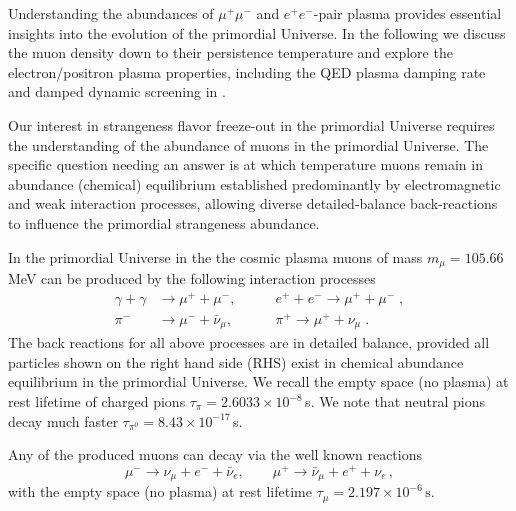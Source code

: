 Understanding the abundances of $\mu^+\mu^-$ and $e^+e^-$-pair plasma provides essential insights into the evolution of the primordial Universe. In the following we discuss the muon density down to their persistence temperature and explore the electron/positron plasma properties, including the QED plasma damping rate and damped dynamic screening in .

Our interest in strangeness flavor freeze-out in the primordial Universe requires the understanding of the abundance of muons in the primordial Universe. The specific question needing an answer is at which temperature muons remain in abundance (chemical) equilibrium established predominantly by electromagnetic and weak interaction processes, allowing diverse detailed-balance back-reactions to influence the primordial strangeness abundance.

In the primordial Universe in the the cosmic plasma muons of mass $m_\mu=105.66$\,MeV can be produced by the following interaction processes~\cite{Yang:2024ret,Rafelski:2021aey}
\begin{align} 
\gamma+\gamma&\longrightarrow\mu^++\mu^-,\qquad &e^++e^-\longrightarrow \mu^++\mu^-\;,\\
\pi^-&\longrightarrow\mu^-+\bar{\nu}_\mu,\qquad &\pi^+ \longrightarrow\mu^++\nu_\mu\;.
\end{align}
The back reactions for all above processes are in detailed balance, provided all particles shown on the right hand side (RHS) exist in chemical abundance equilibrium in the primordial Universe. We recall the empty space (no plasma) at rest lifetime of charged pions $\tau_\pi=2.6033\times 10^{-8}$\,s. We note that neutral pions decay much faster $\tau_{\pi^0}=8.43\times 10^{-17}$\,s.

Any of the produced muons can decay via the well known reactions
\begin{equation}
\mu^-\rightarrow\nu_\mu+e^-+\bar{\nu}_e,\qquad \mu^+\rightarrow\bar{\nu}_\mu+e^++\nu_e\,,
\end{equation} 
with the empty space (no plasma) at rest lifetime $\tau_{\mu}=2.197 \times 10^{-6}\,\mathrm{s}$. 
 
